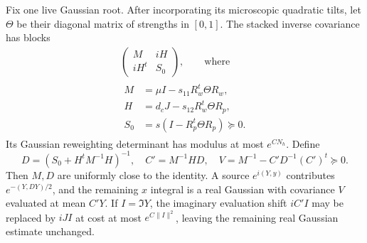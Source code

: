 \begin{lemma}\label{xyh:mixed}
Fix one live Gaussian root. After incorporating its microscopic quadratic
tilts, let $\Theta$ be their diagonal matrix of strengths in $[0,1]$.
The stacked inverse covariance has blocks
\begin{equation}\label{xyh:completed-precision}
 \begin{gathered}
 \begin{pmatrix}M&iH\\iH^t&S_0\end{pmatrix},\qquad\text{where}\\
 \begin{aligned}
 M&=\mu I-s_{11}R_w^t\Theta R_w,\\
 H&=d_cJ-s_{12}R_w^t\Theta R_p,\\
 S_0&=s(I-R_p^t\Theta R_p)\succeq0.
 \end{aligned}
 \end{gathered}
\end{equation}
Its Gaussian reweighting determinant has modulus at most $e^{CN_h}$.
Define
\begin{equation}\label{xyh:completion-matrices}
 D=(S_0+H^tM^{-1}H)^{-1},\quad C'=M^{-1}HD,
 \quad V=M^{-1}-C'D^{-1}(C')^t\succeq0.
\end{equation}
Then $M,D$ are uniformly close to the identity. A source $e^{i(Y,y)}$
contributes $e^{-(Y,DY)/2}$, and the remaining $x$ integral is a real
Gaussian with covariance $V$ evaluated at mean $C'Y$.
If $I=\Im Y$, the imaginary evaluation shift $iC'I$ may be replaced by
$iJI$ at cost at most $e^{C\|I\|^2}$, leaving the remaining real
Gaussian estimate unchanged.
\end{lemma}
